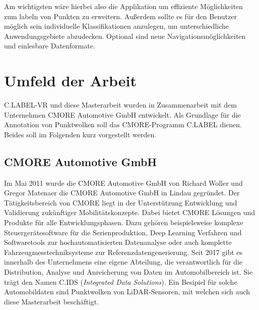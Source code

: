 Am wichtigsten wäre hierbei also die Applikation um effiziente Möglichkeiten zum labeln von Punkten zu erweitern. Außerdem sollte es für den Benutzer möglich sein individuelle Klassifikationen anzulegen, um unterschiedliche Anwendungsgebiete abzudecken. Optional sind neue Navigationsmöglichkeiten und einlesbare Datenformate.

\section{Umfeld der Arbeit}
C.LABEL-VR und diese Masterarbeit wurden in Zusammenarbeit mit dem Unternehmen CMORE Automotive GmbH entwickelt. Als Grundlage für die Annotation von Punktwolken soll das CMORE-Programm C.LABEL dienen. Beides soll im Folgenden kurz vorgestellt werden. 

\subsection{CMORE Automotive GmbH}
\label{sec:CMORE}
Im Mai 2011 wurde die CMORE Automotive GmbH von Richard Woller und Gregor Matenaer die CMORE Automotive GmbH in Lindau gegründet. Der Tätigkeitsbereich von CMORE liegt in der Unterstützung Entwicklung und Validierung zukünftiger Mobilitätskonzepte. Dabei bietet CMORE Lösungen und Produkte für alle Entwicklungsphasen. Dazu gehören beispielsweise komplexe Steuergerätesoftware für die Serienproduktion, Deep Learning Verfahren und Softwaretools zur hochautomatisierten Datenanalyse oder auch komplette Fahrzeugmesstechniksysteme zur Referenzdatengenerierung. Seit 2017 gibt es innerhalb des Unternehmens eine eigene Abteilung, die verantwortlich für die Distribution, Analyse und Anreicherung von Daten im Automobilbereich ist. Sie trägt den Namen C.IDS (\textit{Integrated Data Solutions}). Ein Besipiel für solche Automobildaten sind Punktwolken von LiDAR-Sensoren, mit welchen sich auch diese Masterarbeit beschäftigt.     

